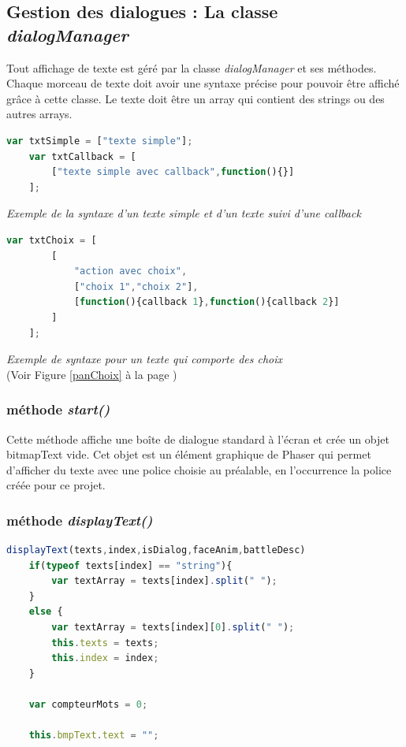 \documentclass[11pt]{article}
\begin{document}
\begin{appendices}
\subsection{Gestion des dialogues : La classe \textit{dialogManager}}
Tout affichage de texte est géré par la classe \textit{dialogManager} et ses méthodes. 
Chaque morceau de texte doit avoir une syntaxe précise pour pouvoir être affiché grâce à cette classe. Le texte doit être un array qui contient des strings ou des autres arrays.
\begin{lstlisting}[language=JavaScript]
	var txtSimple = ["texte simple"];
	var txtCallback = [
		["texte simple avec callback",function(){}]
	];
\end{lstlisting}
\textit{Exemple de la syntaxe d'un texte simple et d'un texte suivi d'une callback}\\
\begin{lstlisting}[language=JavaScript]
	var txtChoix = [
		[
			"action avec choix",
			["choix 1","choix 2"],
			[function(){callback 1},function(){callback 2}]
		]
	];
\end{lstlisting} 
\textit{Exemple de syntaxe pour un texte qui comporte des choix}\\
(Voir Figure \ref{panChoix} à la page \pageref{panChoix})
\subsubsection{méthode \textit{start()}}
Cette méthode affiche une boîte de dialogue standard à l'écran et crée un objet bitmapText vide. Cet objet est un élément graphique de Phaser qui permet d'afficher du texte avec une police choisie au préalable, en l'occurrence la police créée pour ce projet.
\subsubsection{méthode \textit{displayText()}}
\begin{lstlisting}[language=JavaScript]
displayText(texts,index,isDialog,faceAnim,battleDesc)
    if(typeof texts[index] == "string"){
        var textArray = texts[index].split(" "); 
    }
    else {
        var textArray = texts[index][0].split(" ");
        this.texts = texts;
        this.index = index;
    }

    var compteurMots = 0;

    this.bmpText.text = "";


\end{lstlisting}
\end{appendices}
\end{document}

